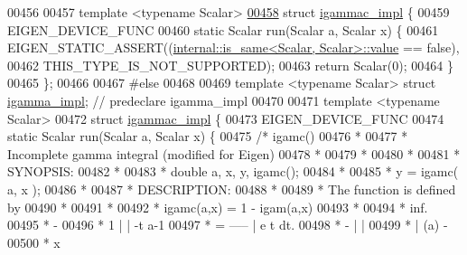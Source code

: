 \begin{DoxyCode}
00456 
00457 \textcolor{keyword}{template} <\textcolor{keyword}{typename} Scalar>
\hyperlink{struct_eigen_1_1internal_1_1igammac__impl}{00458} \textcolor{keyword}{struct }\hyperlink{struct_eigen_1_1internal_1_1igammac__impl}{igammac\_impl} \{
00459   EIGEN\_DEVICE\_FUNC
00460   \textcolor{keyword}{static} Scalar run(Scalar a, Scalar x) \{
00461     EIGEN\_STATIC\_ASSERT((\hyperlink{struct_eigen_1_1internal_1_1is__same}{internal::is\_same<Scalar, Scalar>::value} 
      == \textcolor{keyword}{false}),
00462                         THIS\_TYPE\_IS\_NOT\_SUPPORTED);
00463     \textcolor{keywordflow}{return} Scalar(0);
00464   \}
00465 \};
00466 
00467 \textcolor{preprocessor}{#else}
00468 
00469 \textcolor{keyword}{template} <\textcolor{keyword}{typename} Scalar> \textcolor{keyword}{struct }\hyperlink{struct_eigen_1_1internal_1_1igamma__impl}{igamma\_impl};  \textcolor{comment}{// predeclare igamma\_impl}
00470 
00471 \textcolor{keyword}{template} <\textcolor{keyword}{typename} Scalar>
00472 \textcolor{keyword}{struct }\hyperlink{struct_eigen_1_1internal_1_1igammac__impl}{igammac\_impl} \{
00473   EIGEN\_DEVICE\_FUNC
00474   \textcolor{keyword}{static} Scalar run(Scalar a, Scalar x) \{
00475     \textcolor{comment}{/*  igamc()}
00476 \textcolor{comment}{     *}
00477 \textcolor{comment}{     *  Incomplete gamma integral (modified for Eigen)}
00478 \textcolor{comment}{     *}
00479 \textcolor{comment}{     *}
00480 \textcolor{comment}{     *}
00481 \textcolor{comment}{     * SYNOPSIS:}
00482 \textcolor{comment}{     *}
00483 \textcolor{comment}{     * double a, x, y, igamc();}
00484 \textcolor{comment}{     *}
00485 \textcolor{comment}{     * y = igamc( a, x );}
00486 \textcolor{comment}{     *}
00487 \textcolor{comment}{     * DESCRIPTION:}
00488 \textcolor{comment}{     *}
00489 \textcolor{comment}{     * The function is defined by}
00490 \textcolor{comment}{     *}
00491 \textcolor{comment}{     *}
00492 \textcolor{comment}{     *  igamc(a,x)   =   1 - igam(a,x)}
00493 \textcolor{comment}{     *}
00494 \textcolor{comment}{     *                            inf.}
00495 \textcolor{comment}{     *                              -}
00496 \textcolor{comment}{     *                     1       | |  -t  a-1}
00497 \textcolor{comment}{     *               =   -----     |   e   t   dt.}
00498 \textcolor{comment}{     *                    -      | |}
00499 \textcolor{comment}{     *                   | (a)    -}
00500 \textcolor{comment}{     *                             x}

\end{DoxyCode}
